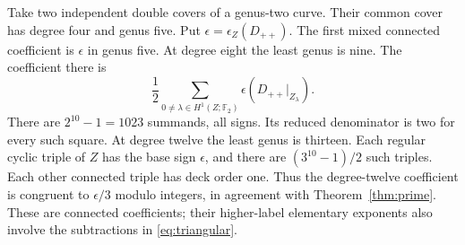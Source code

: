 \begin{example}\label{ex:prime}
Take two independent double covers of a genus-two curve. Their common
cover has degree four and genus five. Put $\epsilon=\epsilon_Z(D_{++})$.
The first mixed connected coefficient is $\epsilon$ in genus five.
At degree eight the least genus is nine. The coefficient there is
\[
 \frac12\sum_{0\ne\lambda\in H^1(Z;\mathbb F_2)}
            \epsilon(D_{++}|_{Z_\lambda}) .
\]
There are $2^{10}-1=1023$ summands, all signs. Its reduced denominator
is two for every such square. At degree twelve the least genus is
thirteen. Each regular cyclic triple of $Z$ has the base sign
$\epsilon$, and there are $(3^{10}-1)/2$ such triples. Each other
connected triple has deck order one. Thus the degree-twelve coefficient
is congruent to $\epsilon/3$ modulo integers, in agreement with
Theorem~\ref{thm:prime}. These are connected coefficients; their
higher-label elementary exponents also involve the subtractions in
\eqref{eq:triangular}.
\end{example}

